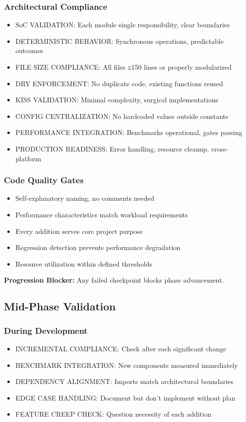 \documentclass{article}
\begin{document}
\subsubsection{Architectural Compliance}
\begin{itemize}[noitemsep]
\item SoC VALIDATION: Each module single responsibility, clear boundaries
\item DETERMINISTIC BEHAVIOR: Synchronous operations, predictable outcomes
\item FILE SIZE COMPLIANCE: All files ≤150 lines or properly modularized
\item DRY ENFORCEMENT: No duplicate code, existing functions reused
\item KISS VALIDATION: Minimal complexity, surgical implementations
\item CONFIG CENTRALIZATION: No hardcoded values outside constants
\item PERFORMANCE INTEGRATION: Benchmarks operational, gates passing
\item PRODUCTION READINESS: Error handling, resource cleanup, cross-platform
\end{itemize}

\subsubsection{Code Quality Gates}
\begin{itemize}[noitemsep]
\item Self-explanatory naming, no comments needed
\item Performance characteristics match workload requirements
\item Every addition serves core project purpose
\item Regression detection prevents performance degradation
\item Resource utilization within defined thresholds
\end{itemize}

\textbf{Progression Blocker:} Any failed checkpoint blocks phase advancement.

\subsection{Mid-Phase Validation}

\subsubsection{During Development}
\begin{itemize}[noitemsep]
\item INCREMENTAL COMPLIANCE: Check after each significant change
\item BENCHMARK INTEGRATION: New components measured immediately
\item DEPENDENCY ALIGNMENT: Imports match architectural boundaries
\item EDGE CASE HANDLING: Document but don't implement without plan
\item FEATURE CREEP CHECK: Question necessity of each addition
\end{itemize}
\end{document}
